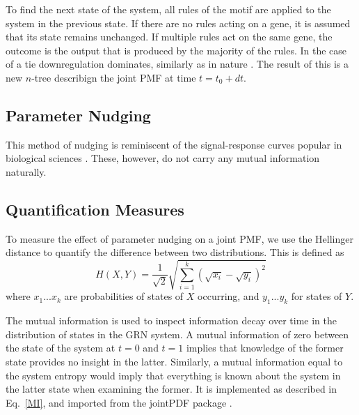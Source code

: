 \documentclass[../main.tex]{subfiles}
\begin{document}
To find the next state of the system, all rules of the motif are applied to the system in the previous state.
If there are no rules acting on a gene, it is assumed that its state remains unchanged.
If multiple rules act on the same gene, the outcome is the output that is produced by the majority of the rules.
In the case of a tie downregulation dominates, similarly as in nature \cite{}.
The result of this is a new $n$-tree describign the joint PMF at time $t=t_0+dt$.




\subsection{Parameter Nudging}


This method of nudging is reminiscent of the signal-response curves popular in biological sciences \cite{tyson2010functional}.
These, however, do not carry any mutual information naturally.

\subsection{Quantification Measures}

To measure the effect of parameter nudging on a joint PMF, we use the Hellinger distance to quantify the difference between two distributions.
This is defined as
%
\begin{equation}
H(X, Y) = \frac{1}{\sqrt{2}} \sqrt{\sum^k_{i=1} (\sqrt{x_i} - \sqrt{y_i})^2}
\end{equation}
%
where ${x_1 ... x_k}$ are probabilities of states of $X$ occurring, and ${y_1 ... y_k}$ for states of $Y$.

The mutual information is used to inspect information decay over time in the distribution of states in the GRN system.
A mutual information of zero between the state of the system at $t=0$ and $t=1$ implies that knowledge of the former state provides no insight in the latter.
Similarly, a mutual information equal to the system entropy would imply that everything is known about the system in the latter state when examining the former.
It is implemented as described in Eq.~\ref{MI}, and imported from the jointPDF package \cite{jointpdf}.
\end{document}
